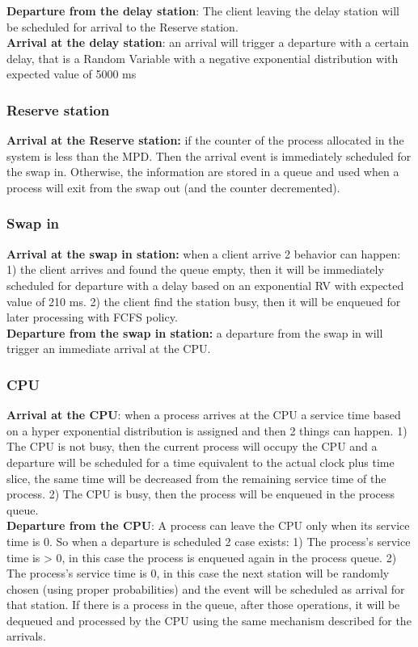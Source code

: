 \documentclass[12pt,a4paper]{article}
\begin{document}
\textbf{Departure from the delay station}: The client leaving the delay station will be scheduled for arrival to the Reserve station.
\\
\textbf{Arrival at the delay station}:
an arrival will trigger a departure with a certain delay, that is a Random Variable with a negative exponential distribution with expected value of 5000 ms
\\
\subsubsection{Reserve station}
\textbf{Arrival at the Reserve station:} if the counter of the process allocated in the system is less than the MPD. Then the  arrival event is immediately scheduled for the swap in. Otherwise, the information are stored in a queue and used when a process will exit from the swap out (and the counter decremented).

\subsubsection{Swap in}
\textbf{Arrival at the swap in station:} when a client arrive 2 behavior can happen: 1) the client arrives and found the queue empty, then it will be immediately scheduled for departure with a delay based on an exponential RV with expected value of 210 ms. 2) the client find the station busy, then it will be enqueued for later processing with FCFS policy.
\\
\textbf{Departure from the swap in station:} a departure from the swap in will trigger an immediate arrival at the CPU.


\subsubsection{CPU}
\textbf{Arrival at the CPU}: when a process arrives at the CPU a service time based on a hyper exponential distribution is assigned and then 2 things can happen. 1) The CPU is not busy, then the current process will occupy the CPU and a departure will be scheduled for a time equivalent to the actual clock plus time slice, the same time will be decreased from the remaining service time of the process. 2) The CPU is busy, then the process will be enqueued in the process queue.
\\
\textbf{Departure from the CPU}: A process can leave the CPU only when its service time is 0. So when a departure is scheduled 2 case exists: 1) The process's service time is > 0, in this case the process is enqueued again in the process queue. 2) The process's service time is 0, in this case the next station will be randomly chosen (using proper probabilities) and the event will be scheduled as arrival for that station. If there is a process in the queue, after those operations, it will be dequeued and processed by the CPU using the same mechanism described for the arrivals.
\end{document}
